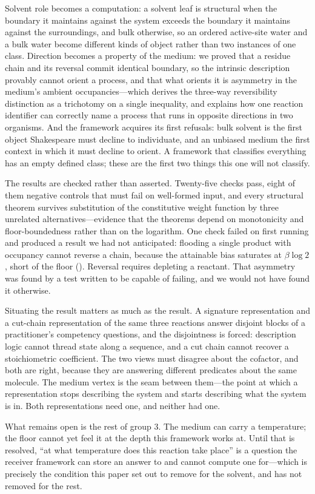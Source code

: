 \documentclass[11pt,twocolumn,a4paper]{article}
\theoremstyle{thmstyle}
\theoremstyle{definition}
\theoremstyle{remark}
\newcommand{\flo}{\beta}
\begin{document}
Solvent role becomes a computation: a solvent leaf is structural when the
boundary it maintains against the system exceeds the boundary it maintains
against the surroundings, and bulk otherwise, so an ordered active-site
water and a bulk water become different kinds of object rather than two
instances of one class. Direction becomes a property of the medium: we
proved that a residue chain and its reversal commit identical boundary,
so the intrinsic description provably cannot orient a process, and that
what orients it is asymmetry in the medium's ambient occupancies---which
derives the three-way reversibility distinction as a trichotomy on a
single inequality, and explains how one reaction identifier can correctly
name a process that runs in opposite directions in two organisms. And the
framework acquires its first refusals: bulk solvent is the first object
Shakespeare must decline to individuate, and an unbiased medium the first
context in which it must decline to orient. A framework that classifies
everything has an empty defined class; these are the first two things this
one will not classify.

The results are checked rather than asserted. Twenty-five checks pass,
eight of them negative controls that must fail on well-formed input, and
every structural theorem survives substitution of the constitutive weight
function by three unrelated alternatives---evidence that the theorems
depend on monotonicity and floor-boundedness rather than on the
logarithm. One check failed on first running and produced a result we had
not anticipated: flooding a single product with occupancy cannot reverse
a chain, because the attainable bias saturates at $\flo\log 2$, short of
the floor (). Reversal requires depleting a reactant.
That asymmetry was found by a test written to be capable of failing, and
we would not have found it otherwise.

Situating the result matters as much as the result. A signature
representation and a cut-chain representation of the same three reactions
answer disjoint blocks of a practitioner's competency questions, and the
disjointness is forced: description logic cannot thread state along a
sequence, and a cut chain cannot recover a stoichiometric coefficient. The
two views must disagree about the cofactor, and both are right, because
they are answering different predicates about the same molecule. The
medium vertex is the seam between them---the point at which a
representation stops describing the system and starts describing what the
system is in. Both representations need one, and neither had one.

What remains open is the rest of group 3. The medium can carry a
temperature; the floor cannot yet feel it at the depth this framework
works at. Until that is resolved, ``at what temperature does this reaction
take place'' is a question the receiver framework can store an answer to
and cannot compute one for---which is precisely the condition this paper
set out to remove for the solvent, and has not removed for the rest.



\end{document}
